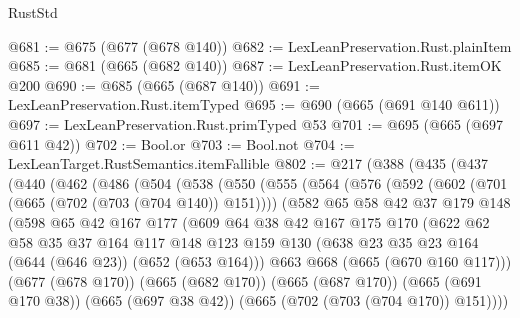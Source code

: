 \begin{lexlean}{RustStd}
\begin{coremodule}
@681 := @675 (@677 (@678 @140))
@682 := LexLeanPreservation.Rust.plainItem
@685 := @681 (@665 (@682 @140))
@687 := LexLeanPreservation.Rust.itemOK @200
@690 := @685 (@665 (@687 @140))
@691 := LexLeanPreservation.Rust.itemTyped
@695 := @690 (@665 (@691 @140 @611))
@697 := LexLeanPreservation.Rust.primTyped @53
@701 := @695 (@665 (@697 @611 @42))
@702 := Bool.or
@703 := Bool.not
@704 := LexLeanTarget.RustSemantics.itemFallible
@802 := @217
    (@388
      (@435
        (@437
          (@440
            (@462
              (@486
                (@504
                  (@538
                    (@550
                      (@555
                        (@564
                          (@576
                            (@592
                              (@602 (@701 (@665 (@702 (@703 (@704 @140)) @151))))
                              (@582
                                @65
                                @58
                                @42
                                @37
                                @179
                                @148
                                (@598
                                  @65
                                  @42
                                  @167
                                  @177
                                  (@609
                                    @64
                                    @38
                                    @42
                                    @167
                                    @175
                                    @170
                                    (@622
                                      @62
                                      @58
                                      @35
                                      @37
                                      @164
                                      @117
                                      @148
                                      @123
                                      @159
                                      @130
                                      (@638 @23 @35 @23 @164 (@644 (@646 @23)) (@652 (@653 @164)))
                                      @663
                                      @668
                                      (@665 (@670 @160 @117)))
                                    (@677 (@678 @170))
                                    (@665 (@682 @170))
                                    (@665 (@687 @170))
                                    (@665 (@691 @170 @38))
                                    (@665 (@697 @38 @42))
                                    (@665 (@702 (@703 (@704 @170)) @151))))

\end{coremodule}
\end{lexlean}
